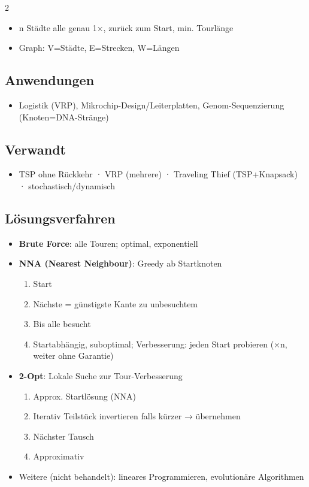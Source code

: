 \documentclass[10pt, a4paper]{article}
\begin{document}
\begin{multicols}{2}
\begin{itemize}
  \item n Städte alle genau 1×, zurück zum Start, min. Tourlänge
  \item Graph: V=Städte, E=Strecken, W=Längen
\end{itemize}


\subsection{Anwendungen}
\begin{itemize}
  \item Logistik (VRP), Mikrochip-Design/Leiterplatten, Genom-Sequenzierung (Knoten=DNA-Stränge)
\end{itemize}


\subsection{Verwandt}
\begin{itemize}
  \item TSP ohne Rückkehr · VRP (mehrere) · Traveling Thief (TSP+Knapsack) · stochastisch/dynamisch
\end{itemize}


\subsection{Lösungsverfahren}
\begin{itemize}
  \item \textbf{Brute Force}: alle Touren; optimal, exponentiell
  \item \textbf{NNA (Nearest Neighbour)}: Greedy ab Startknoten
\begin{enumerate}
  \item Start
  \item Nächste = günstigste Kante zu unbesuchtem
  \item Bis alle besucht
  \item Startabhängig, suboptimal; Verbesserung: jeden Start probieren (×n, weiter ohne Garantie)
\end{enumerate}
  \item \textbf{2-Opt}: Lokale Suche zur Tour-Verbesserung
\begin{enumerate}
  \item Approx. Startlösung (NNA)
  \item Iterativ Teilstück invertieren falls kürzer → übernehmen
  \item Nächster Tausch
  \item Approximativ
\end{enumerate}
  \item Weitere (nicht behandelt): lineares Programmieren, evolutionäre Algorithmen
\end{itemize}







\end{multicols}
\end{document}
